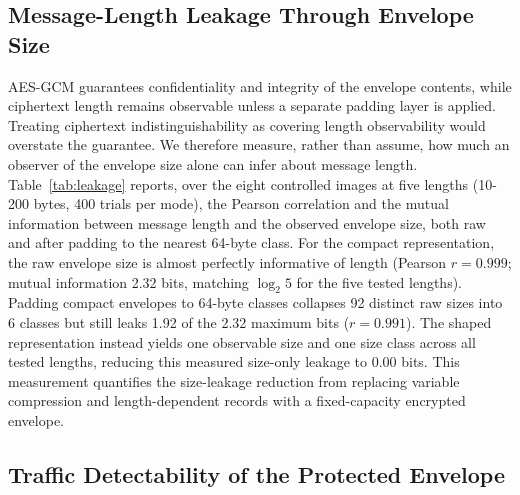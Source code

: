 \documentclass[preprint,12pt]{elsarticle}
\theoremstyle{plain}
\providecommand{\DIFaddtex}[1]{{\protect\color{blue} \sf #1}} %
\providecommand{\DIFdeltex}[1]{{\protect\color{red} \scriptsize #1}} %
\providecommand{\DIFaddbegin}{} %
\providecommand{\DIFaddend}{} %
\providecommand{\DIFdelbegin}{} %
\providecommand{\DIFdelend}{} %
\providecommand{\DIFadd}[1]{\texorpdfstring{\DIFaddtex{#1}}{#1}} %
\providecommand{\DIFdel}[1]{\texorpdfstring{\DIFdeltex{#1}}{}} %
\providecommand{\DIFscaledelfig}{0.5}
\newlength{\DIFdelgraphicswidth} %
\newlength{\DIFdelgraphicsheight} %
\providecommand{\DIFaddincludegraphics}[2][]{{\color{blue}\fbox{\DIFOincludegraphics[#1]{#2}}}} %
\providecommand{\DIFdelincludegraphics}[2][]{%
\sbox{\DIFdelgraphicsbox}{\DIFOincludegraphics[#1]{#2}}%
\settoboxwidth{\DIFdelgraphicswidth}{\DIFdelgraphicsbox} %
\settoboxtotalheight{\DIFdelgraphicsheight}{\DIFdelgraphicsbox} %
\scalebox{\DIFscaledelfig}{%
\parbox[b]{\DIFdelgraphicswidth}{\usebox{\DIFdelgraphicsbox}\\[-\baselineskip] \rule{\DIFdelgraphicswidth}{0em}}\llap{\resizebox{\DIFdelgraphicswidth}{\DIFdelgraphicsheight}{%
\setlength{\unitlength}{\DIFdelgraphicswidth}%
\begin{picture}(1,1)%
\thicklines\linethickness{2pt} %
{\color[rgb]{1,0,0}\put(0,0){\framebox(1,1){}}}%
{\color[rgb]{1,0,0}\put(0,0){\line( 1,1){1}}}%
{\color[rgb]{1,0,0}\put(0,1){\line(1,-1){1}}}%
\end{picture}%
}\hspace*{3pt}}} %
} %
\DeclareRobustCommand{\DIFaddbegin}{\DIFOaddbegin \let\includegraphics\DIFaddincludegraphics} %
\DeclareRobustCommand{\DIFaddend}{\DIFOaddend \let\includegraphics\DIFOincludegraphics} %
\DeclareRobustCommand{\DIFdelbegin}{\DIFOdelbegin \let\includegraphics\DIFdelincludegraphics} %
\DeclareRobustCommand{\DIFdelend}{\DIFOaddend \let\includegraphics\DIFOincludegraphics} %
\renewcommand{\DIFdel}[1]{}
\renewcommand{\DIFdelincludegraphics}[2][]{}
\begin{document}
\subsection{Message-Length Leakage Through Envelope Size}

AES-GCM guarantees confidentiality and integrity of the envelope contents,
\DIFdelbegin \DIFdel{but neither AES-GCM nor any generic authenticated encryption scheme hides
the length of its own ciphertext ; treating ciphertext }\DIFdelend \DIFaddbegin \DIFadd{while ciphertext length remains observable unless a separate padding layer is
applied. Treating ciphertext }\DIFaddend indistinguishability as covering length
observability would overstate the guarantee. We therefore
measure, rather than assume, how much an observer of the envelope size alone
can infer about message length. Table~\ref{tab:leakage} reports, over the
eight controlled images at five lengths (10-200 bytes, 400 trials per mode),
the Pearson correlation and the mutual information between message length and
the observed envelope size, both raw and after padding to the nearest
64-byte class. For the compact representation, the raw envelope size is almost
perfectly informative of length (Pearson $r=0.999$; mutual information
2.32 bits, matching $\log_2 5$ for the five tested lengths). Padding compact
envelopes to 64-byte classes collapses 92 distinct raw sizes into 6 classes
but still leaks 1.92 of the 2.32 maximum bits ($r=0.991$). The shaped
representation instead yields one observable size and one size class across
all tested lengths, reducing this measured size-only leakage to 0.00 bits.
This measurement quantifies the size-leakage reduction from replacing
variable compression and length-dependent records with a fixed-capacity
encrypted envelope.

\begin{table}[!t]
\centering
\caption{Message-Length Leakage Through Envelope Size (64-Byte Padding Classes)}
\label{tab:leakage}
{\small\setlength{\tabcolsep}{4pt}}
\end{table}

\subsection{Traffic Detectability of the Protected Envelope}
\end{document}
